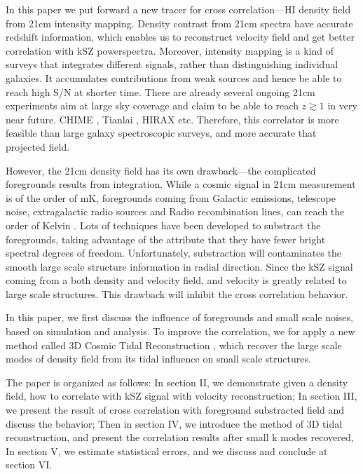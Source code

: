 In this paper we put forward a new tracer for cross correlation---HI density field from 21cm intensity mapping. 
Density contrast from 21cm spectra have accurate redshift information, 
which enables us to reconstruct velocity field and 
get better correlation with kSZ powerspectra. 
Moreover, intensity mapping is a kind of surveys that 
integrates different signals, 
rather than distinguishing individual galaxies. 
It accumulates contributions from weak sources 
and hence be able to reach high S/N at shorter time. 
There are already several ongoing 21cm experiments aim at large sky coverage and claim to be able to reach $z\gtrsim1$ in very near future.
CHIME \cite{2014SPIE.9145E..22B}, Tianlai \cite{2015ApJ...798...40X}, 
HIRAX \cite{HIRAX} etc.
Therefore, this correlator is more feasible than large galaxy spectroscopic surveys, 
and more accurate that projected field.

However, the 21cm density field has its own drawback---the complicated foregrounds results from integration. 
While a cosmic signal in 21cm measurement is of the order of mK,  
foregrounds coming from Galactic emissions, telescope noise, 
extragalactic radio sources and Radio recombination lines, 
can reach the order of Kelvin \cite{DiMatteo04}\cite{Masui13}. 
Lots of techniques have been developed to substract the foregrounds, 
taking advantage of the attribute that they have fewer bright spectral
degrees of freedom\cite{Switzer15}.
Unfortunately, substraction will contaminates the smooth large scale structure information in radial direction.
Since the kSZ signal coming from a both density and velocity field, 
and velocity is greatly related to large scale structures. 
This drawback will inhibit the cross correlation behavior.

In this paper, 
we first discuss the influence of foregrounds and small scale noises, 
based on simulation and analysis. 
To improve the correlation, we for apply a new method called 3D Cosmic Tidal Reconstruction \cite{2012:pen}\cite{2015:zhu}, which recover the large scale modes of density field from its tidal influence on small scale structures. 

The paper is organized as follows: 
In section II, we demonstrate given a density field, how to correlate with kSZ signal with velocity reconstruction; 
In section III, we present the result of cross correlation with foreground substracted field 
and discuss the behavior; 
Then in section IV, we introduce the method of 3D tidal reconstruction, 
and present the correlation results after small k modes recovered, 
In section V, we estimate statistical errors, 
and we discuss and conclude at section VI.

